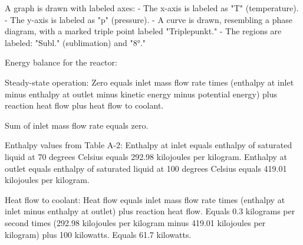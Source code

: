 A graph is drawn with labeled axes:  
- The x-axis is labeled as "T" (temperature).  
- The y-axis is labeled as "p" (pressure).  
- A curve is drawn, resembling a phase diagram, with a marked triple point labeled "Triplepunkt."  
- The regions are labeled: "Subl." (sublimation) and "8°."

Energy balance for the reactor:  

Steady-state operation:  
Zero equals inlet mass flow rate times (enthalpy at inlet minus enthalpy at outlet minus kinetic energy minus potential energy) plus reaction heat flow plus heat flow to coolant.  

Sum of inlet mass flow rate equals zero.  

Enthalpy values from Table A-2:  
Enthalpy at inlet equals enthalpy of saturated liquid at 70 degrees Celsius equals 292.98 kilojoules per kilogram.  
Enthalpy at outlet equals enthalpy of saturated liquid at 100 degrees Celsius equals 419.01 kilojoules per kilogram.  

Heat flow to coolant:  
Heat flow equals inlet mass flow rate times (enthalpy at inlet minus enthalpy at outlet) plus reaction heat flow.  
Equals 0.3 kilograms per second times (292.98 kilojoules per kilogram minus 419.01 kilojoules per kilogram) plus 100 kilowatts.  
Equals 61.7 kilowatts.